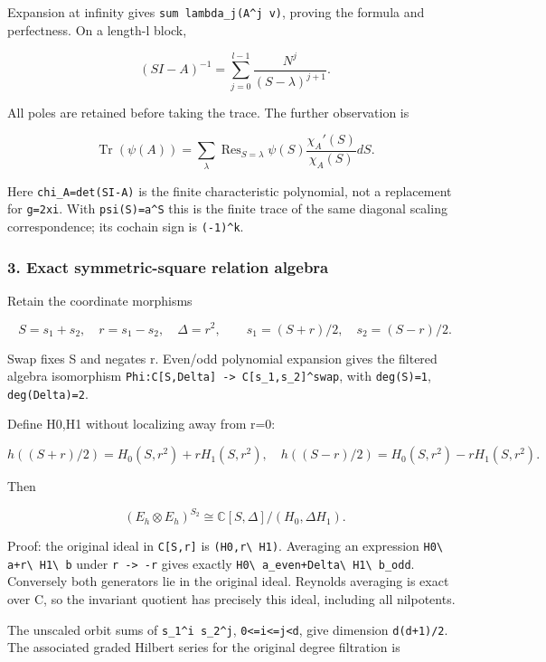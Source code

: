 Expansion at infinity gives \texttt{sum\ lambda\_j(A\^{}j\ v)}, proving the formula and perfectness.
On a length-l block,

\[(SI-A)^{-1}=\sum_{j=0}^{l-1}\frac{N^j}{(S-\lambda)^{j+1}}.\]

All poles are retained before taking the trace. The further observation is

\[\operatorname{Tr}(\psi(A))=\sum_\lambda\operatorname{Res}_{S=\lambda}\psi(S)\frac{\chi_A'(S)}{\chi_A(S)}dS.\]

Here \nolinkurl{chi_A=det(SI-A)} is the finite characteristic polynomial, not a replacement for
\nolinkurl{g=2xi}. With \texttt{psi(S)=a\^{}S} this is the finite trace of the same diagonal scaling
correspondence; its cochain sign is \texttt{(-1)\^{}k}.

\subsubsection{3. Exact symmetric-square relation
algebra}\label{pr_17:exact-symmetric-square-relation-algebra}

Retain the coordinate morphisms

\[S=s_1+s_2,\quad r=s_1-s_2,\quad\Delta=r^2,\qquad s_1=(S+r)/2,\quad s_2=(S-r)/2.\]

Swap fixes S and negates r. Even/odd polynomial expansion gives the filtered algebra isomorphism
\texttt{Phi:C{[}S,Delta{]}\ -\textgreater{}\ C{[}s\_1,s\_2{]}\^{}swap}, with \nolinkurl{deg(S)=1},
\nolinkurl{deg(Delta)=2}.

Define H0,H1 without localizing away from r=0:

\[h((S+r)/2)=H_0(S,r^2)+rH_1(S,r^2),\quad h((S-r)/2)=H_0(S,r^2)-rH_1(S,r^2).\]

Then

\[\boxed{(E_h\otimes E_h)^{S_2}\cong\mathbb C[S,\Delta]/(H_0,\Delta H_1).}\]

Proof: the original ideal in \texttt{C{[}S,r{]}} is \nolinkurl{(H0,r\ H1)}. Averaging an expression
\nolinkurl{H0\ a+r\ H1\ b} under \texttt{r\ -\textgreater{}\ -r} gives exactly
\nolinkurl{H0\ a_even+Delta\ H1\ b_odd}. Conversely both generators lie in the original ideal.
Reynolds averaging is exact over C, so the invariant quotient has precisely this ideal, including
all nilpotents.

The unscaled orbit sums of \texttt{s\_1\^{}i\ s\_2\^{}j},
\texttt{0\textless{}=i\textless{}=j\textless{}d}, give dimension \nolinkurl{d(d+1)/2}. The associated
graded Hilbert series for the original degree filtration is

